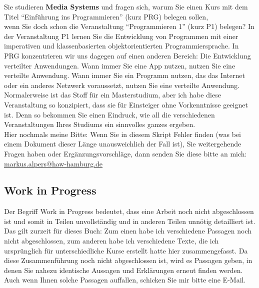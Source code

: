 Sie studieren \textbf{Media Systems} und fragen sich, warum Sie einen Kurs mit dem Titel "`Einführung ins Programmieren"' (kurz PRG) belegen sollen,\\
wenn Sie doch schon die Veranstaltung "`Programmieren 1"' (kurz P1) belegen? In der Veranstaltung P1 lernen Sie die Entwicklung von Programmen mit einer imperativen und klassenbasierten objektorientierten Programmiersprache. In PRG konzentrieren wir uns dagegen auf einen anderen Bereich: Die Entwicklung verteilter Anwendungen. Wann immer Sie eine App nutzen, nutzen Sie eine verteilte Anwendung. Wann immer Sie ein Programm nutzen, das das Internet oder ein anderes Netzwerk voraussetzt, nutzen Sie eine verteilte Anwendung. Normalerweise ist das Stoff für ein Masterstudium, aber ich habe diese Veranstaltung so konzipiert, dass sie für Einsteiger ohne Vorkenntnisse geeignet ist. Denn so bekommen Sie einen Eindruck, wie all die verschiedenen Veranstaltungen Ihres Studiums ein sinnvolles ganzes ergeben.\\

Hier nochmals meine Bitte: Wenn Sie in diesem Skript Fehler finden (was bei einem Dokument dieser Länge unausweichlich der Fall ist), Sie weitergehende Fragen haben oder Ergänzungsvorschläge, dann senden Sie diese bitte an mich: \url{markus.alpers@haw-hamburg.de}

\subsection*{Work in Progress}

Der Begriff Work in Progress bedeutet, dass eine Arbeit noch nicht abgeschlossen ist und somit in Teilen unvollständig und in anderen Teilen unnötig detailliert ist. Das gilt zurzeit für dieses Buch: Zum einen habe ich verschiedene Passagen noch nicht abgeschlossen, zum anderen habe ich verschiedene Texte, die ich ursprünglich für unterschiedliche Kurse erstellt hatte hier zusammengefasst. Da diese Zusammenführung noch nicht abgeschlossen ist, wird es Passagen geben, in denen Sie nahezu identische Aussagen und Erklärungen erneut finden werden. Auch wenn Ihnen solche Passagen auffallen, schicken Sie mir bitte eine E-Mail.
